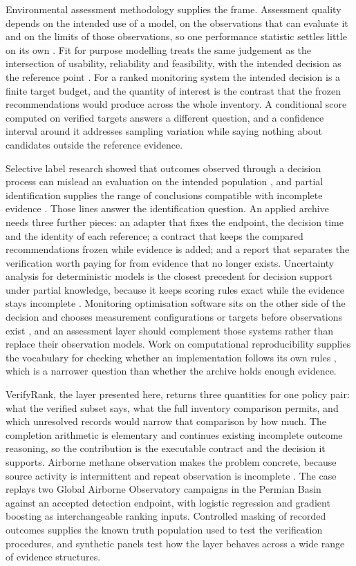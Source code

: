 \documentclass[a4paper,fleqn,longmktitle]{cas-sc}
\begin{document}
Environmental assessment methodology supplies the frame. Assessment quality depends on the intended use of a model, on the observations that can evaluate it and on the limits of those observations, so one performance statistic settles little on its own \citep{bennett2013}. Fit for purpose modelling treats the same judgement as the intersection of usability, reliability and feasibility, with the intended decision as the reference point \citep{hamilton2022}. For a ranked monitoring system the intended decision is a finite target budget, and the quantity of interest is the contrast that the frozen recommendations would produce across the whole inventory. A conditional score computed on verified targets answers a different question, and a confidence interval around it addresses sampling variation while saying nothing about candidates outside the reference evidence.

Selective label research showed that outcomes observed through a decision process can mislead an evaluation on the intended population \citep{lakkaraju2017}, and partial identification supplies the range of conclusions compatible with incomplete evidence \citep{manski1989}. Those lines answer the identification question. An applied archive needs three further pieces: an adapter that fixes the endpoint, the decision time and the identity of each reference; a contract that keeps the compared recommendations frozen while evidence is added; and a report that separates the verification worth paying for from evidence that no longer exists. Uncertainty analysis for deterministic models is the closest precedent for decision support under partial knowledge, because it keeps scoring rules exact while the evidence stays incomplete \citep{uusitalo2015}. Monitoring optimisation software sits on the other side of the decision and chooses measurement configurations or targets before observations exist \citep{klise2020,ravindra2024}, and an assessment layer should complement those systems rather than replace their observation models. Work on computational reproducibility supplies the vocabulary for checking whether an implementation follows its own rules \citep{essawy2020,zhu2025}, which is a narrower question than whether the archive holds enough evidence.

VerifyRank, the layer presented here, returns three quantities for one policy pair: what the verified subset says, what the full inventory comparison permits, and which unresolved records would narrow that comparison by how much. The completion arithmetic is elementary and continues existing incomplete outcome reasoning, so the contribution is the executable contract and the decision it supports. Airborne methane observation makes the problem concrete, because source activity is intermittent and repeat observation is incomplete \citep{cusworth2021,cusworth2026}. The case replays two Global Airborne Observatory campaigns in the Permian Basin against an accepted detection endpoint, with logistic regression and gradient boosting as interchangeable ranking inputs. Controlled masking of recorded outcomes supplies the known truth population used to test the verification procedures, and synthetic panels test how the layer behaves across a wide range of evidence structures.
\end{document}
